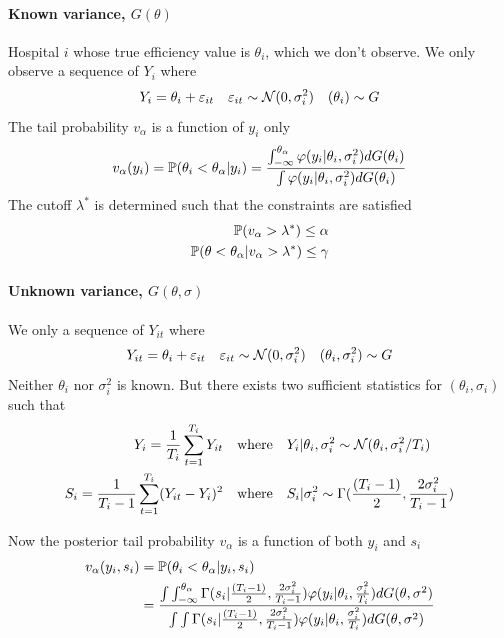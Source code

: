 \documentclass[12pt]{article}
\begin{document}
\paragraph{Known variance, $G(\theta)$}
Hospital $i$ whose true efficiency value is $\theta_i$, which we don't observe.
We only observe a sequence of $Y_{i}$ where
\begin{equation*}
    Y_{i} = \theta_i + \varepsilon_{it} \quad \varepsilon_{it} \sim \mathcal{N}(0,\sigma_i^2) \quad (\theta_i) \sim G
\end{equation*}
The tail probability $v_\alpha$ is a function of $y_i$ only
\begin{equation*}
    v_\alpha(y_i) =\mathbb{P}(\theta_i<\theta_\alpha|y_i) =\frac{\int_{-\infty}^{\theta_\alpha} \varphi(y_i|\theta_i,\sigma_i^2)dG(\theta_i)}{\int \varphi(y_i|\theta_i,\sigma_i^2)dG(\theta_i)}
\end{equation*}
The cutoff $\lambda^*$ is determined such that the constraints are satisfied
\begin{align*}
    \mathbb{P}(v_\alpha>\lambda^*) \le \alpha \\
    \mathbb{P}(\theta<\theta_\alpha|v_\alpha>\lambda^*) \le \gamma
\end{align*}

\paragraph{Unknown variance, $G(\theta,\sigma)$}
We only a sequence of $Y_{it}$ where
\begin{equation*}
    Y_{it} = \theta_i + \varepsilon_{it} \quad \varepsilon_{it} \sim \mathcal{N}(0,\sigma_i^2) \quad (\theta_i,\sigma_i^2) \sim G
\end{equation*}
Neither $\theta_i$ nor $\sigma_i^2$ is known. But there exists two sufficient statistics for $(\theta_i,\sigma_i)$ such that
\begin{align*}
    Y_i=\frac{1}{T_i}\sum_{t=1}^{T_i}Y_{it}           & \quad \text{where}\quad Y_i|\theta_i,\sigma_i^2 \sim \mathcal{N}(\theta_i,\sigma_i^2/T_i)              \\
    S_i=\frac{1}{T_i-1}\sum_{t=1}^{T_i}(Y_{it}-Y_i)^2 & \quad \text{where} \quad S_i|\sigma_i^2 \sim \Gamma(\frac{(T_i-1)}{2},\frac{2\sigma_i^2}{T_i-1})
\end{align*}

Now the posterior tail probability $v_\alpha$ is a function of both $y_i$ and
$s_i$
\begin{align*}
    v_\alpha(y_i,s_i) & =\mathbb{P}(\theta_i<\theta_\alpha|y_i,s_i)                                                                                                                                                                                                                                                                \\
                      & =\frac{\int\int_{-\infty}^{\theta_\alpha} \Gamma(s_i|\frac{(T_i-1)}{2},\frac{2\sigma_i^2}{T_i-1})\varphi(y_i|\theta_i,\frac{\sigma_i^2}{T_i})dG(\theta,\sigma^2)}{\int\int \Gamma(s_i|\frac{(T_i-1)}{2},\frac{2\sigma_i^2}{T_i-1})\varphi(y_i|\theta_i,\frac{\sigma_i^2}{T_i})dG(\theta,\sigma^2)} \\
\end{align*}
\end{document}
